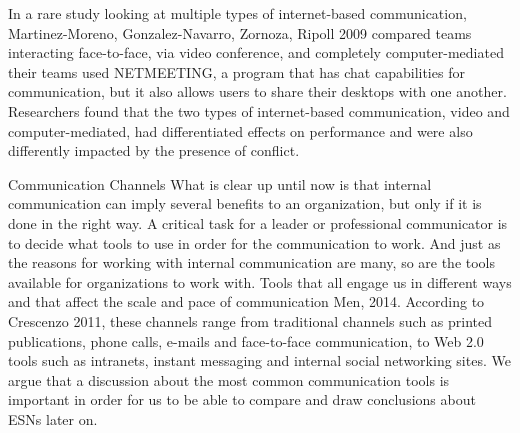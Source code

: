 In a rare study looking at multiple types of internet-based communication, Martinez-Moreno, Gonzalez-Navarro, Zornoza,  Ripoll 2009 compared teams interacting face-to-face, via video conference, and completely computer-mediated their teams used NETMEETING, a program that has chat capabilities for communication, but it also allows users to share their desktops with one another. Researchers found that the two types of internet-based communication, video and computer-mediated, had differentiated effects on performance and were also differently impacted by the presence of conflict.

Communication Channels 
What is clear up until now is that internal communication can imply several benefits to an organization, but only if it is done in the right way. A critical task for a leader or professional communicator is to decide what tools to use in order for the communication to work. And just as the reasons for working with internal communication are many, so are the tools available for organizations to work with. Tools that all engage us in different ways and that affect the scale and pace of communication Men, 2014. According to Crescenzo 2011, these channels range from traditional channels such as printed publications, phone calls, e-mails and face-to-face communication, to Web 2.0 tools such as intranets, instant messaging and internal social networking sites. We argue that a discussion about the most common communication tools is important in order for us to be able to compare and draw conclusions about ESNs later on.

